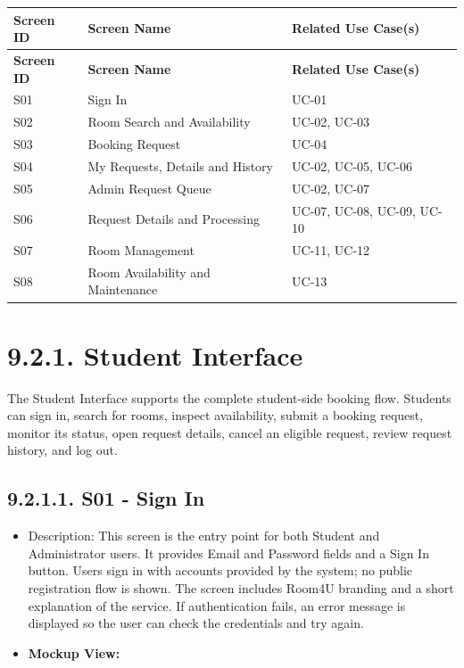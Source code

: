 \begin{longtable}{|p{}|p{}|p{}|}
\hline
\textbf{Screen ID} & \textbf{Screen Name} & \textbf{Related Use Case(s)} \\
\hline
\endfirsthead
\hline
\textbf{Screen ID} & \textbf{Screen Name} & \textbf{Related Use Case(s)} \\
\hline
\endhead
S01 & Sign In & UC-01 \\
\hline
S02 & Room Search and Availability & UC-02, UC-03 \\
\hline
S03 & Booking Request & UC-04 \\
\hline
S04 & My Requests, Details and History & UC-02, UC-05, UC-06 \\
\hline
S05 & Admin Request Queue & UC-02, UC-07 \\
\hline
S06 & Request Details and Processing & UC-07, UC-08, UC-09, UC-10 \\
\hline
S07 & Room Management & UC-11, UC-12 \\
\hline
S08 & Room Availability and Maintenance & UC-13 \\
\hline
\end{longtable}

\section*{9.2.1. Student Interface}\label{student-interface}

The Student Interface supports the complete student-side booking flow.
Students can sign in, search for rooms, inspect availability, submit a
booking request, monitor its status, open request details, cancel an
eligible request, review request history, and log out.

\subsection*{9.2.1.1. S01 - Sign In}\label{s01---sign-in}

\begin{itemize}
\item
  Description: This screen is the entry point for both Student and
  Administrator users. It provides Email and Password fields and a Sign
  In button. Users sign in with accounts provided by the system; no
  public registration flow is shown. The screen includes Room4U branding
  and a short explanation of the service. If authentication fails, an
  error message is displayed so the user can check the credentials and
  try again.
\item
  \textbf{Mockup View:}
\end{itemize}

